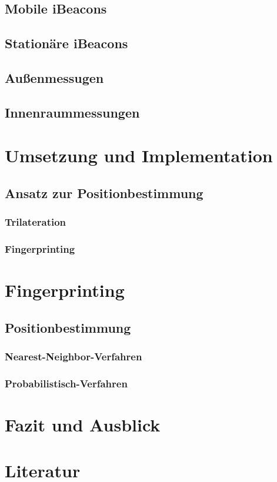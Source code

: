 \documentclass[liststotoc,a4paper, 12pt]{scrartcl}
\begin{document}
\subsection{Mobile iBeacons}
\subsection{Stationäre iBeacons}
\subsection{Außenmessugen}
\subsection{Innenraummessungen}

\section{Umsetzung und Implementation}

\subsection{Ansatz zur Positionbestimmung}
\subsubsection{Trilateration}
\subsubsection{Fingerprinting}

\section{Fingerprinting}
\subsection{Positionbestimmung}
\subsubsection{Nearest-Neighbor-Verfahren}
\subsubsection{Probabilistisch-Verfahren}

\section{Fazit und Ausblick}

\section{Literatur}
\end{document}
